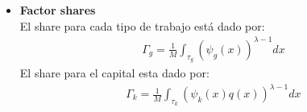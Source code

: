 \documentclass{article}
\theoremstyle{remark}
\theoremstyle{definition}
\begin{document}
\begin{itemize}
    Ahora podemos definir los conjuntos $\tau_{f}; \ f \in \{l_{c},l_{r},l_{s},l_{j},K\}$, los cuales contienen las tareas asignadas a cada tipo de trabajo y al capital:

    \begin{align*}
        \tau_{g}&=\left\{x \middle|  \frac{w_{g}}{A_{g}\psi_{g}(x)} < \frac{w_{g'}}{A_{g'}\psi_{g'}(x)} \leq \frac{1}{A_{k}\psi_{k}(x)q(x)} \right\} \\
        \tau_{k}&=\left\{x \middle| \frac{1}{A_{k}\psi_{k}(x)q(x)} < \frac{w_{g}}{A_{g}\psi_{g}(x)} \right\}
    \end{align*}
    \item \textbf{Factor shares} \\
    El share para cada tipo de trabajo est\'a dado por:
    \begin{align*}
        \Gamma_{g} = \frac{1}{M}\int_{{\tau}_{g}}\left(\psi_g(x)\right)^{\lambda-1}dx
    \end{align*}
    El share para el capital esta dado por:
    \begin{align*}
        \Gamma_{k} = \frac{1}{M}\int_{{\tau}_{k}}\left(\psi_k(x)q(x)\right)^{\lambda-1}dx
    \end{align*}
\end{itemize}
\end{document}
